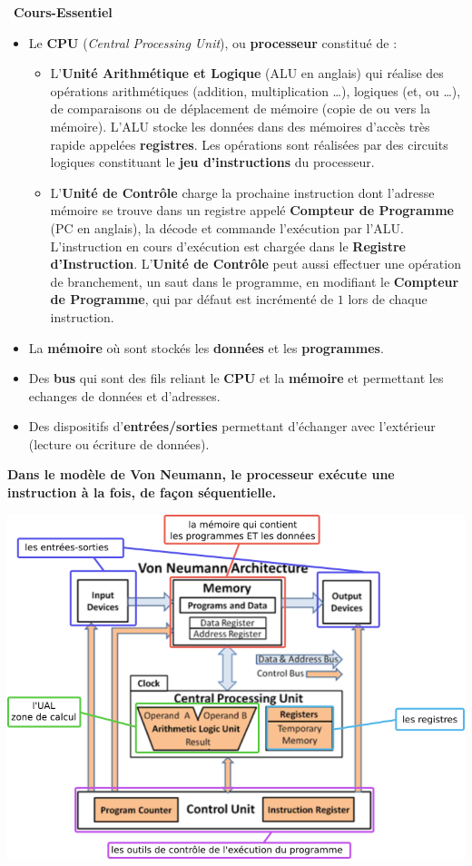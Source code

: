 \documentclass[a4paper, french, 11pt]{article}  %
\newcounter{cours}
\newenvironment{cours}[1]
{\par \medskip   \addtocounter{cours}{1} \noindent  
\begin{bclogo}[arrondi =0.1,  ombre = true, barre=none, logo=\bcbook, marge=4]{~\textbf{Cours-Essentiel} \textbf{\thecours} {\itshape #1} }  \par}
{
\end{bclogo}
 \par \bigskip }
\newcounter{prog}
\begin{document}
\begin{cours}{}
\begin{itemize}[label=]
\item Le \textbf{CPU} (\textit{Central Processing Unit}), ou \textbf{processeur }constitué de :
	\begin{itemize}
		\item L'\textbf{Unité Arithmétique et Logique} (ALU en anglais) qui réalise des opérations arithmétiques (addition, multiplication \ldots), logiques (et, ou \ldots), de comparaisons ou de déplacement de mémoire (copie de ou vers la mémoire). L'ALU stocke les données dans des mémoires d'accès très rapide appelées \textbf{registres}. Les opérations sont réalisées par des circuits logiques constituant le \textbf{jeu d'instructions} du processeur. 
	   \item L'\textbf{Unité de Contrôle} charge la prochaine instruction dont l'adresse mémoire se trouve dans un registre appelé \textbf{Compteur de Programme} (PC en anglais), la décode et commande l'exécution par l'ALU. L'instruction en cours d'exécution est chargée dans le \textbf{Registre d'Instruction}. L'\textbf{Unité de Contrôle} peut aussi effectuer une opération de branchement, un saut dans le programme, en modifiant le \textbf{Compteur de Programme}, qui par défaut est incrémenté de $1$ lors de chaque instruction.
	\end{itemize}
	
\item La \textbf{mémoire} où sont stockés les \textbf{données} et les \textbf{programmes}.
\item Des \textbf{bus} qui sont des fils reliant le \textbf{CPU} et la \textbf{mémoire} et permettant les echanges de données et d'adresses.
\item Des dispositifs d'\textbf{entrées/sorties} permettant d'échanger avec l'extérieur (lecture ou écriture de données).
\end{itemize}

\textbf{Dans le modèle de Von Neumann, le processeur exécute une instruction à la fois, de façon séquentielle.} 


\begin{center}
\includegraphics[scale=0.5]{images/arch.png}


\end{center}
\end{cours}
\end{document}
